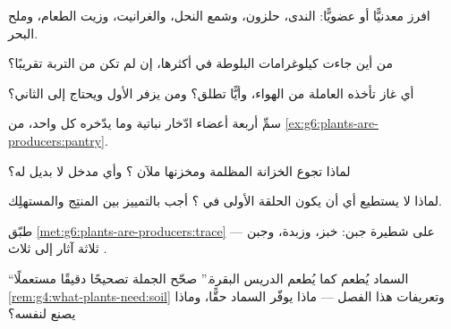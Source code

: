 \begin{exercise}[$\star$]\label{exo:g6:plants-are-producers:3}
افرز معدنيًّا أو عضويًّا: الندى،  حلزون، وشمع النحل، والغرانيت،
وزيت الطعام، وملح البحر.
\end{exercise}

\begin{exercise}[$\star$]\label{exo:g6:plants-are-producers:4}
من أين جاءت كيلوغرامات البلوطة في أكثرها، إن لم تكن من التربة
تقريبًا؟
\end{exercise}

\begin{exercise}[$\star$]\label{exo:g6:plants-are-producers:5}
أي غاز تأخذه  العاملة من الهواء، وأيًّا تطلق؟ ومن يزفر الأول
ويحتاج إلى الثاني؟
\end{exercise}

\begin{exercise}[$\star$]\label{exo:g6:plants-are-producers:6}
سمِّ أربعة أعضاء ادّخار نباتية وما يدّخره كل واحد، من
\cref{ex:g6:plants-are-producers:pantry}.
\end{exercise}

\begin{exercise}[$\star\star$]\label{exo:g6:plants-are-producers:7}
لماذا تجوع  الخزانة المظلمة ومخزنها ملآن ؟
وأي مدخل لا بديل له؟
\end{exercise}

\begin{exercise}[$\star\star$]\label{exo:g6:plants-are-producers:8}
لماذا لا يستطيع أي  أن يكون الحلقة الأولى في ؟
أجب بالتمييز بين المنتِج والمستهلِك.
\end{exercise}

\begin{exercise}[$\star\star$]\label{exo:g6:plants-are-producers:9}
طبّق \cref{met:g6:plants-are-producers:trace} على شطيرة جبن: خبز،
وزبدة، وجبن --- ثلاثة آثار إلى ثلاث .
\end{exercise}

\begin{exercise}[$\star\star$]\label{exo:g6:plants-are-producers:10}
``السماد يُطعم  كما يُطعم الدريس البقرة.'' صحّح الجملة
تصحيحًا دقيقًا مستعملًا \cref{rem:g4:what-plants-need:soil}
وتعريفات هذا الفصل --- ماذا يوفّر السماد حقًّا، وماذا يصنع 
لنفسه؟
\end{exercise}

